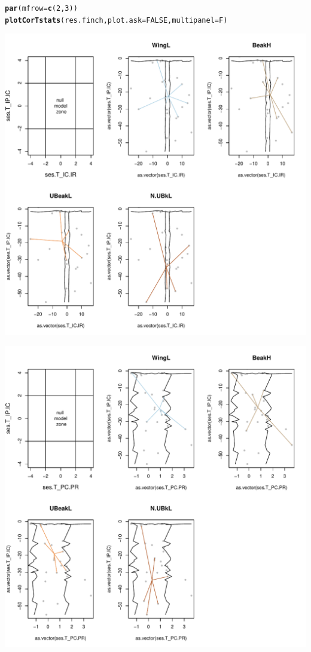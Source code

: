 \documentclass[12pt]{article}\usepackage[]{graphicx}\usepackage[]{color}
\makeatletter
\def\maxwidth{ %
  \ifdim\Gin@nat@width>\linewidth
    \linewidth
  \else
    \Gin@nat@width
  \fi
}
\newcommand{\hlnum}[1]{\textcolor[rgb]{0.686,0.059,0.569}{#1}}%
\newcommand{\hlstd}[1]{\textcolor[rgb]{0.345,0.345,0.345}{#1}}%
\newcommand{\hlkwc}[1]{\textcolor[rgb]{0.333,0.667,0.333}{#1}}%
\newcommand{\hlkwd}[1]{\textcolor[rgb]{0.737,0.353,0.396}{\textbf{#1}}}%
\newenvironment{kframe}{%
 \def\at@end@of@kframe{}%
 \ifinner\ifhmode%
  \def\at@end@of@kframe{\end{minipage}}%
  \begin{minipage}{\columnwidth}%
 \fi\fi%
 \def\FrameCommand##1{\hskip\@totalleftmargin \hskip-\fboxsep
 \colorbox{shadecolor}{##1}\hskip-\fboxsep
     \hskip-\linewidth \hskip-\@totalleftmargin \hskip\columnwidth}%
 \MakeFramed {\advance\hsize-\width
   \@totalleftmargin\z@ \linewidth\hsize
   \@setminipage}}%
 {\par\unskip\endMakeFramed%
 \at@end@of@kframe}
\newenvironment{knitrout}{}{} %
\makeatother
\begin{document}
\begin{knitrout}
\color{fgcolor}\begin{kframe}
\begin{alltt}
\hlkwd{par}\hlstd{(}\hlkwc{mfrow} \hlstd{=} \hlkwd{c}\hlstd{(}\hlnum{2}\hlstd{,}\hlnum{3}\hlstd{))}
\hlkwd{plotCorTstats}\hlstd{(res.finch,} \hlkwc{plot.ask} \hlstd{=} \hlnum{FALSE}\hlstd{,} \hlkwc{multipanel} \hlstd{= F)}
\end{alltt}
\end{kframe}
\includegraphics[width=\maxwidth]{figure/unnamed-chunk-391} 

\includegraphics[width=\maxwidth]{figure/unnamed-chunk-392} 


\end{knitrout}
\end{document}

